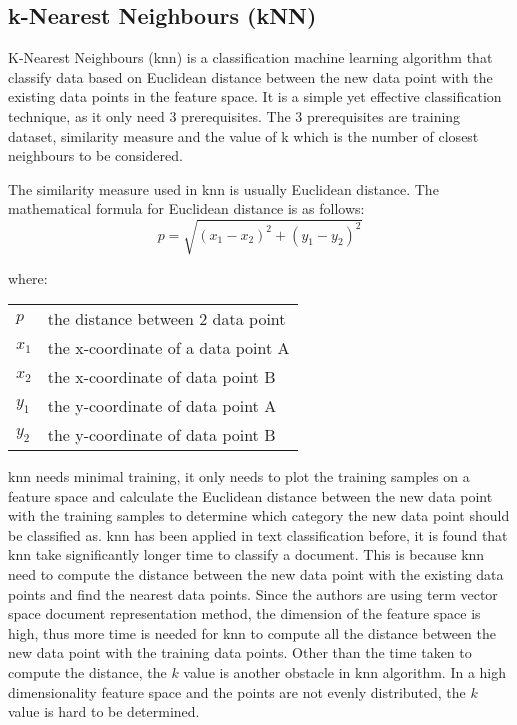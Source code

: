 \subsection{k-Nearest Neighbours (kNN)}
K-Nearest Neighbours (\ac{knn}) is a classification machine learning algorithm that classify data based on Euclidean distance between the new data point with the existing data points in the feature space. It is a simple yet effective classification technique, as it only need 3 prerequisites. The 3 prerequisites are training dataset, similarity measure and the value of k which is the number of closest neighbours to be considered. 

The similarity measure used in \ac{knn} is usually Euclidean distance. The mathematical formula for Euclidean distance is as follows:
\begin{equation}
p = \sqrt{(x_{1} - x_{2})^{2} + (y_{1} - y_{2})^{2}}
\end{equation}

where:
\begin{center}
	\begin{tabular}{l @{ $=$ } l}
		$p$ & the distance between 2 data point\\
		$x_{1}$ & the x-coordinate of a data point A\\
		$x_{2}$ & the x-coordinate of data point B\\
		$y_{1}$ & the y-coordinate of data point A\\
		$y_{2}$ & the y-coordinate of data point B\\
	\end{tabular}
\end{center}
	

\Ac{knn} needs minimal training, it only needs to plot the training samples on a feature space and calculate the Euclidean distance between the new data point with the training samples to determine which category the new data point should be classified as. \Ac{knn} has been applied in text classification before, it is found that \ac{knn} take significantly longer time to classify a document. This is because \ac{knn} need to compute the distance between the new data point with the existing data points and find the nearest data points. Since the authors are using term vector space document representation method, the dimension of the feature space is high, thus more time is needed for \ac{knn} to compute all the distance between the new data point with the training data points. Other than the time taken to compute the distance, the $k$ value is another obstacle in \ac{knn} algorithm. In a high dimensionality feature space and the points are not evenly distributed, the $k$ value is hard to be determined.

